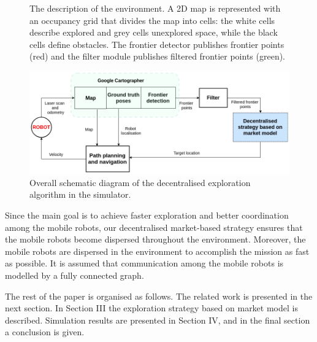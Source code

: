 \begin{figure}{}
    \centering
	\caption {The description of the environment. A 2D map is represented with an occupancy grid that divides the map into cells: the white cells describe explored and grey cells unexplored space, while the black cells define obstacles. The frontier detector publishes frontier points (red) and the filter module publishes filtered frontier points (green).}
	\label{fig:environment}
\end{figure}

\begin{figure}
    \centering\includegraphics[width=1.0\columnwidth]{./Pictures/diagram_exploration2.png}
	\caption{Overall schematic diagram of the decentralised exploration algorithm in the simulator.}
   \label{fig:exploration-strategy}
\end{figure}

Since the main goal is to achieve faster exploration and better coordination among the mobile robots, our decentralised market-based strategy ensures that the mobile robots become dispersed throughout the environment. Moreover, the mobile robots are dispersed in the environment to accomplish the mission as fast as possible. It is assumed that communication among the mobile robots is modelled by a fully connected graph.

The rest of the paper is organised as follows. The related work is presented in the next section. In Section III the exploration strategy based on market model is described. Simulation results are presented in Section IV, and in the final section a conclusion is given.